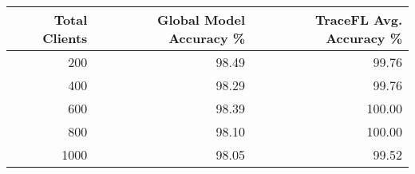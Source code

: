 \begin{tabular}{rrr}
\toprule
Total Clients & Global Model Accuracy \% & TraceFL Avg. Accuracy \% \\
\midrule
200 & 98.49 & 99.76 \\
400 & 98.29 & 99.76 \\
600 & 98.39 & 100.00 \\
800 & 98.10 & 100.00 \\
1000 & 98.05 & 99.52 \\
\bottomrule
\end{tabular}
